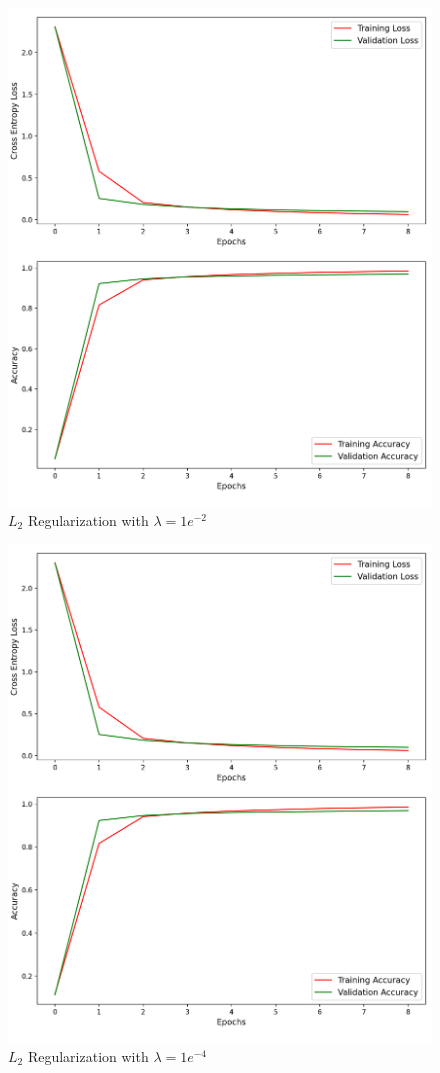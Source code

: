 \begin{figure}[!ht]
	\centering
	\includegraphics[width=1.0\textwidth]{./images/l2_e2.png}
	\caption{$L_2$ Regularization with $\lambda = 1e^{-2}$}
	\label{fig:l2_1e2}
\end{figure}

\begin{figure}[!ht]
	\centering
	\includegraphics[width=1.0\textwidth]{./images/l2_e4.png}
	\caption{$L_2$ Regularization with $\lambda = 1e^{-4}$}
	\label{fig:l2_1e4}
\end{figure}
